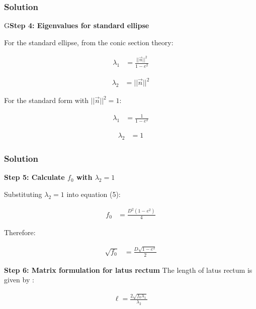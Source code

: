 \documentclass{beamer}
\numberwithin{equation}{section}
\begin{document}
\begin{frame}[fragile]
    \frametitle{Solution}
G\textbf{Step 4: Eigenvalues for standard ellipse}

For the standard ellipse, from the conic section theory:

\begin{align}
\lambda_1 &= \frac{||\vec{n}||^2}{1-e^2}
\end{align}

\begin{align}
\lambda_2 &= ||\vec{n}||^2
\end{align}

For the standard form with $||\vec{n}||^2 = 1$:

\begin{align}
\lambda_1 &= \frac{1}{1-e^2}
\end{align}

\begin{align}
\lambda_2 &= 1
\end{align}

\end{frame}

\begin{frame}[fragile]
    \frametitle{Solution}
\textbf{Step 5: Calculate $f_0$ with $\lambda_2 = 1$}

Substituting $\lambda_2 = 1$ into equation (5):

\begin{align}
f_0 &= \frac{D^2(1-e^2)}{4}
\end{align}

Therefore:

\begin{align}
\sqrt{f_0} &= \frac{D\sqrt{1-e^2}}{2}
\end{align}

\textbf{Step 6: Matrix formulation for latus rectum}
The length of latus rectum is given by :

\begin{align}
\ell = \frac{2\sqrt{f_0 \lambda_1}}{\lambda_2}
\end{align}


\end{frame}
\end{document}
